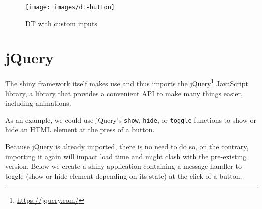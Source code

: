 \documentclass[
  10pt,
]{krantz}
\makeatletter
\newenvironment{Shaded}{\begin{snugshade}}{\end{snugshade}}
\newcommand{\AttributeTok}[1]{\textcolor[rgb]{0.61,0.61,0.61}{#1}}
\newcommand{\CommentTok}[1]{\textcolor[rgb]{0.37,0.37,0.37}{\textit{#1}}}
\newcommand{\NormalTok}[1]{#1}
\newcommand{\OperatorTok}[1]{\textcolor[rgb]{0.43,0.43,0.43}{\textbf{#1}}}
\newcommand{\StringTok}[1]{\textcolor[rgb]{0.5,0.5,0.5}{#1}}
\renewcommand{\href}[2]{#2\footnote{\url{#1}}}
\newenvironment{kframe}{%
\medskip{}
\setlength{\fboxsep}{.8em}
 \def\at@end@of@kframe{}%
 \ifinner\ifhmode%
  \def\at@end@of@kframe{\end{minipage}}%
  \begin{minipage}{\columnwidth}%
 \fi\fi%
 \def\FrameCommand##1{\hskip\@totalleftmargin \hskip-\fboxsep
 \colorbox{shadecolor}{##1}\hskip-\fboxsep
     \hskip-\linewidth \hskip-\@totalleftmargin \hskip\columnwidth}%
 \MakeFramed {\advance\hsize-\width
   \@totalleftmargin\z@ \linewidth\hsize
   \@setminipage}}%
 {\par\unskip\endMakeFramed%
 \at@end@of@kframe}
\renewenvironment{Shaded}{\begin{kframe}}{\end{kframe}}
\makeatother
\begin{document}
\begin{figure}[H]

{\centering \texttt{[image: images/dt-button]} 

}

\caption{DT with custom inputs}\label{fig:dt-button}
\end{figure}

\hypertarget{shiny-tips-jQuery}{%
\section{jQuery}\label{shiny-tips-jQuery}}

The shiny framework itself makes use and thus imports the \href{https://jquery.com/}{jQuery} JavaScript library, a library that provides a convenient API to make many things easier, including animations.

As an example, we could use jQuery's \texttt{show}, \texttt{hide}, or \texttt{toggle} functions to show or hide an HTML element at the press of a button.

\begin{Shaded}
\end{Shaded}

Because jQuery is already imported, there is no need to do so, on the contrary, importing it again will impact load time and might clash with the pre-existing version. Below we create a shiny application containing a message handler to toggle (show or hide element depending on its state) at the click of a button.
\end{document}
